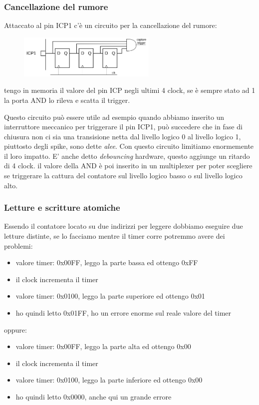 \subsubsection{Cancellazione del rumore}
Attaccato al pin ICP1 c'è un circuito per la cancellazione del rumore:
\begin{figure}[H]
    \centering
    \includegraphics[width=250px]{images/18_Timer/noise_reduction_circuit.png}
\end{figure}
tengo in memoria il valore del pin ICP negli ultimi 4 clock, se è sempre stato ad 1 la porta AND lo rileva e scatta il trigger.

Questo circuito può essere utile ad esempio quando abbiamo inserito un interruttore meccanico per triggerare il pin ICP1, può succedere che in fase di chiusura non ci sia una transisione netta dal livello logico 0 al livello logico 1, piuttosto degli spike, sono dette \emph{alee}. Con questo circuito limitiamo enormemente il loro impatto.
E' anche detto \emph{debouncing} hardware, questo aggiunge un ritardo di 4 clock.
il valore della AND è poi inserito in un multiplexer per poter scegliere se triggerare la cattura del contatore sul livello logico basso o sul livello logico alto.

\subsubsection{Letture e scritture atomiche}
Essendo il contatore locato su due indirizzi per leggere dobbiamo eseguire due letture distinte, se lo facciamo mentre il timer corre potremmo avere dei problemi:
\begin{itemize}
    \item valore timer: 0x00FF, leggo la parte bassa ed ottengo 0xFF
    \item il clock incrementa il timer
    \item valore timer: 0x0100, leggo la parte superiore ed ottengo 0x01
    \item ho quindi letto 0x01FF, ho un errore enorme sul reale valore del timer
\end{itemize}
oppure:
\begin{itemize}
    \item valore timer: 0x00FF, leggo la parte alta ed ottengo 0x00
    \item il clock incrementa il timer
    \item valore timer: 0x0100, leggo la parte inferiore ed ottengo 0x00
    \item ho quindi letto 0x0000, anche qui un grande errore
\end{itemize}


